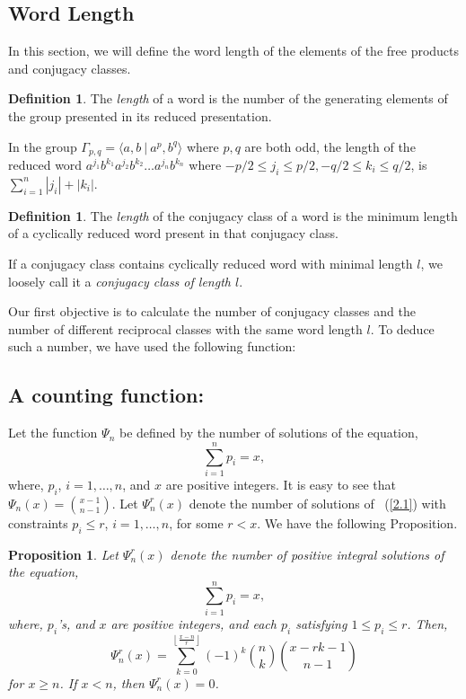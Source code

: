 \documentclass[11pt]{amsart}
\numberwithin{equation}{section}
\newtheorem{pro}[theorem]{Proposition}
\theoremstyle{definition}
\newtheorem{defn}[theorem]{Definition}
\newcommand{\eqnref}[1]{~{\textrm(\ref{#1})}}
\numberwithin{equation}{section}
\begin{document}
	\subsection{Word Length} In this section, we will define the word length of the elements of the free products and conjugacy classes.
	\begin{defn}\label{word}
		The\textit{ length} of a word is the number of the generating elements of the group presented in its reduced presentation.
	\end{defn}
	In the group $\Gamma_{p,q} =\langle a, b ~ | ~ a^{p},b^{q} \rangle  $ where $p,q$ are both odd, the length of the reduced word $ a^{j_{1}}b^{k_{1}}a^{j_{2}}b^{k_{2}}\dots a^{j_{n}}b^{k_{n}} $ where $-p/2\leq j_{i}\leq p/2, -q/2\leq k_{i}\leq q/2 $, is $ \sum_{i=1}^{n}|{j_{i}}|+|{k_{i}}| $.
	\begin{defn}
		The \emph{length} of the conjugacy class of a word is the minimum length of a cyclically reduced word present in that conjugacy class. 
		
		If a conjugacy class contains cyclically reduced word with minimal length $l$, we loosely call it a \emph{conjugacy class of length $l$}. 
	\end{defn}
	Our first objective is to calculate the number of conjugacy classes and the number of different reciprocal classes with the same word length  $l.$ To deduce such a number, we have used the following function:
	
	
	
	\subsection{A counting function: } Let the function $\Psi_{n}$ be defined by the number of solutions of the equation, \begin{equation}\label{2.1}
		\sum_{i=1}^{n} p_{i}=x, 
	\end{equation}
	where, $p_{i}$, $i=1, \ldots, n$,  and $x$ are positive integers. It is easy to see that $\Psi_{n}(x) ={x-1 \choose n-1}$. 
	Let $\Psi_{n}^{r}(x)$ denote the number of solutions of \eqnref{2.1} with constraints $p_i \leq r$, $i=1, \ldots, n$,  for some $r<x$. We have the following Proposition.
	
	\begin{pro}
		
		
		Let \( \Psi^r_n(x) \) denote the number of positive integral solutions of the equation, \begin{equation}\label{2.0}
			\sum_{i=1}^{n} p_{i}=x, 
		\end{equation}
		where, $p_{i}$'s, and $x$ are positive integers, and each $p_{i}$  satisfying \( 1 \leq p_i \leq r \). Then,
		\[
		\Psi^r_n(x) = \sum_{k=0}^{\left\lfloor \frac{x - n}{r} \right\rfloor} (-1)^k \binom{n}{k} \binom{x - rk - 1}{n - 1}
		\]
		for \( x \ge n \). If \( x < n \), then \( \Psi^r_n(x) = 0 \).
	\end{pro}
	
\end{document}
